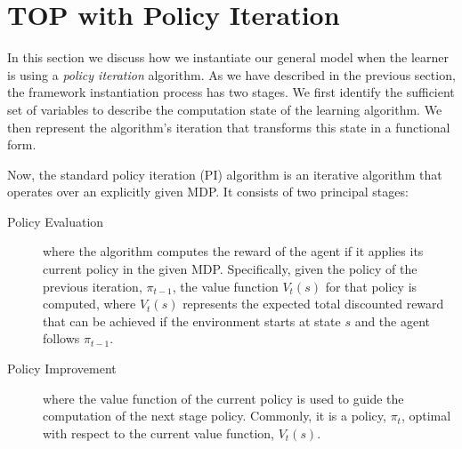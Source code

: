 
\section{TOP with Policy Iteration}\label{sec: TOP-PI}

In this section we discuss how we instantiate our general model when
the learner is using a \emph{policy iteration} algorithm.  As we have
described in the previous section, the framework instantiation process
has two stages. We first identify the sufficient set of variables to
describe the computation state of the learning algorithm. We then
represent the algorithm's iteration that transforms this state in a
functional form.

Now, the standard policy iteration (PI) algorithm is an iterative algorithm
that operates over an explicitly given MDP\cite{puterman_book_94}.  It
consists of two principal stages:
\begin{description}
\item[Policy Evaluation] where the algorithm computes the reward of
  the agent if it applies its current policy in the given
  MDP. Specifically, given the policy of the previous iteration,
  $\pi_{t-1}$, the value function $V_t(s)$ for that policy is
  computed, where $V_t(s)$ represents the expected total discounted
  reward that can be achieved if the environment starts at state $s$
  and the agent follows $\pi_{t-1}$.

\item[Policy Improvement]  where the value function
of the current policy is used to guide the computation of the next
stage policy. Commonly, it is a policy, $\pi_{t}$, optimal with
respect to the current value function, $V_t(s)$.
\end{description}


